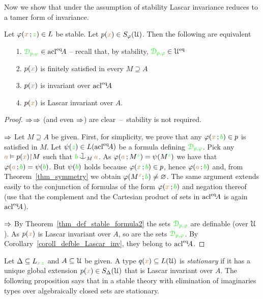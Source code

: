 Now we show that under the assumption of stability Lascar invariance reduces to a tamer form of invariance.

\begin{proposition}\label{prop_type_over_acl2}
  Let $\varphi({\color{brown} x}\,;{\color{green} z})\in L$ be stable.
  Let $p({\color{brown} x})\in S_\varphi(\EuScript U)$. 
  Then the following are equivalent
  \begin{itemize}
  \item[1.] ${\color{green}\EuScript D_{p,\varphi}}\in {\rm acl}^{{\rm eq}}\!A$ -- recall that, by stability, ${\color{green}\EuScript D_{p,\varphi}}\in\EuScript U^{{\rm eq}}$
  \item[2.] $p({\color{brown} x})$ is finitely satisfied in every $M\supseteq A$
  \item[3.] $p({\color{brown} x})$ is invariant over ${\rm acl}^{{\rm eq}}\!A$
  \item[4.] $p({\color{brown} x})$ is Lascar invariant over $A$.
  \end{itemize}
\end{proposition}
\begin{proof}
  $\Rightarrow$$\Rightarrow$ (and even $\Rightarrow$) are clear~--~stability is not required.

  $\Rightarrow$
  Let $M\supseteq A$ be given.
  First, for simplicity, we prove that any $\varphi({\color{brown} x}\,;{\color{green} b})\in p$ is satisfied in $M$.
  Let $\psi({\color{green} z})\in L({\rm acl}^{{\rm eq}}\!A)$ be a formula defining ${\color{green}\EuScript D_{p,\varphi}}$.
  Pick any ${\color{brown} a}\vDash p({\color{brown} x}){\restriction} M$ such that ${\gr b}\cnonfork_M{\mr a}$.
  As $\varphi({\color{brown} a}\,;M^{\color{green} z})=\psi(M^{\color{green} z})$ we have that $\varphi({\color{brown} a}\,;{\color{green} b})=\psi({\color{green} b})$.
  But $\psi({\color{green} b})$ holds because $\varphi({\color{brown} x}\,;{\color{green} b})\in p$, hence $\varphi({\color{brown} a}\,;{\color{green} b})$ and, from Theorem~\ref{thm_symmetry} we obtain $\varphi(M^{\color{brown} x};{\color{green} b})\neq\varnothing$.
  The same argument extends easily to the conjunction of formulas of the form $\varphi({\color{brown} x}\,;{\color{green} b})$ and negation thereof (use that the complement and the Cartesian product of sets in ${\rm acl}^{{\rm eq}}\!A$ is again ${\rm acl}^{{\rm eq}}\!A$).
 
  $\Rightarrow$ By Theorem~\ref{thm_def_stable_formula2} the sets ${\color{green}\EuScript D_{p,\varphi}}$ are definable (over $\EuScript U$).
  As $p({\color{brown} x})$ is Lascar invariant over $A$, so are the sets ${\color{green}\EuScript D_{p,\varphi}}$.
  By Corollary~\ref{coroll_defble_Lascar_inv}, they belong to ${\rm acl}^{{\rm eq}}\!A$.
\end{proof}

Let $\Delta\subseteq L_{{\color{brown} x}\,{\color{green} z}}$ and $A\subseteq\EuScript U$ be given.
A type $q({\color{brown} x})\subseteq L(\EuScript U)$ is \emph{stationary\/} if it has a unique global extension $p({\color{brown} x})\in S_\Delta(\EuScript U)$ that is Lascar invariant over $A$.
The following proposition says that in a stable theory with elimination of imaginaries types over algebraically closed sets are stationary.


